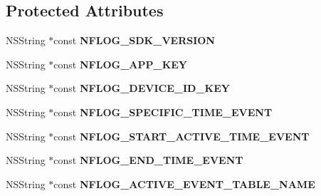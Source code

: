 \subsection*{Protected Attributes}
\begin{DoxyCompactItemize}
\item 
\mbox{\label{interface_n_f_l_o_g_constants_acea2401c8d4f8e70c72bbc353c8bbcb3}} 
N\+S\+String $\ast$const {\bfseries N\+F\+L\+O\+G\+\_\+\+S\+D\+K\+\_\+\+V\+E\+R\+S\+I\+ON}
\item 
\mbox{\label{interface_n_f_l_o_g_constants_ae35201b610d111cf286fb2e8480fcbbd}} 
N\+S\+String $\ast$const {\bfseries N\+F\+L\+O\+G\+\_\+\+A\+P\+P\+\_\+\+K\+EY}
\item 
\mbox{\label{interface_n_f_l_o_g_constants_a727573d17e6d79f0291affaf0bd4553d}} 
N\+S\+String $\ast$const {\bfseries N\+F\+L\+O\+G\+\_\+\+D\+E\+V\+I\+C\+E\+\_\+\+I\+D\+\_\+\+K\+EY}
\item 
\mbox{\label{interface_n_f_l_o_g_constants_ac78884bf0a724bfe219deb0c665c63d7}} 
N\+S\+String $\ast$const {\bfseries N\+F\+L\+O\+G\+\_\+\+S\+P\+E\+C\+I\+F\+I\+C\+\_\+\+T\+I\+M\+E\+\_\+\+E\+V\+E\+NT}
\item 
\mbox{\label{interface_n_f_l_o_g_constants_a0d05abd9a2d2f759034034313629de4c}} 
N\+S\+String $\ast$const {\bfseries N\+F\+L\+O\+G\+\_\+\+S\+T\+A\+R\+T\+\_\+\+A\+C\+T\+I\+V\+E\+\_\+\+T\+I\+M\+E\+\_\+\+E\+V\+E\+NT}
\item 
\mbox{\label{interface_n_f_l_o_g_constants_a6e27ba38b94bd8a83d220da8999abd4f}} 
N\+S\+String $\ast$const {\bfseries N\+F\+L\+O\+G\+\_\+\+E\+N\+D\+\_\+\+T\+I\+M\+E\+\_\+\+E\+V\+E\+NT}
\item 
\mbox{\label{interface_n_f_l_o_g_constants_a35755d4114731e864e82e67ddcd7788b}} 
N\+S\+String $\ast$const {\bfseries N\+F\+L\+O\+G\+\_\+\+A\+C\+T\+I\+V\+E\+\_\+\+E\+V\+E\+N\+T\+\_\+\+T\+A\+B\+L\+E\+\_\+\+N\+A\+ME}
\item 
\mbox{\label{interface_n_f_l_o_g_constants_a1e56c61452a905a9a435eccf40833fc1}} 

\end{DoxyCompactItemize}
